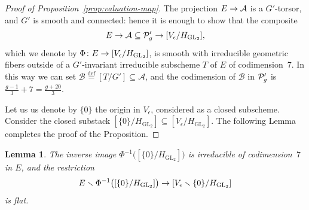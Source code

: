 \documentclass{amsart}
\numberwithin{equation}{section}
\numberwithin{subsection}{section}
\newtheorem{lemma}[theorem]{Lemma}
\theoremstyle{definition}
\theoremstyle{remark}
\newcommand\cA{\mathcal{A}} \newcommand\cB{\mathcal{B}}
\newcommand\arr{\ifinner\to\else\longrightarrow\fi}
\newcommand\eqdef{\overset{\mathrm{\scriptscriptstyle def}} =}
\renewcommand{\setminus}{\smallsetminus}
\newcommand{\GL}{\mathrm{GL}}
\newcommand\Hg{H_{\GL_2}}
\newcommand\Ve{V_{\epsilon}}
\begin{document}
\begin{proof}[Proof of Proposition~\ref{prop:valuation-map}]
The projection $E \arr \cA$ is a $G'$-torsor, and $G'$ is smooth and connected: hence it is enough to show that the composite
   \[
   E \arr \cA \subseteq \cP'_{g}\arr [\Ve/\Hg],
   \]
which we denote by $\Phi\colon E \arr [\Ve/\Hg]$, is smooth with irreducible geometric fibers outside of a $G'$-invariant irreducible subscheme $T$ of $E$ of codimension~$7$. In this way we can set $\cB \eqdef [T/G']  \subseteq \cA$, and the codimension of $\cB$ in $\mathcal{P}'_{g}$ is $\frac{g-1}{3} + 7 = \frac{g+20}{3}$.

Let us us denote by $\{0\}$ the origin in $\Ve$, considered as a closed subscheme. Consider the closed substack $[\{0\}/\Hg] \subseteq [\Ve/\Hg]$. The following Lemma completes the proof of the Proposition.
\end{proof}

\begin{lemma}
The inverse image $\Phi^{-1}\bigl([\{0\}/\Hg]\bigr)$ is irreducible of codimension~$7$ in $E$, and the restriction
   \[
   E \setminus \Phi^{-1}\bigl([\{0\}/\Hg]\bigr) \arr [\Ve \setminus \{0\}/\Hg]
   \]
is flat.
\end{lemma}
\end{document}
